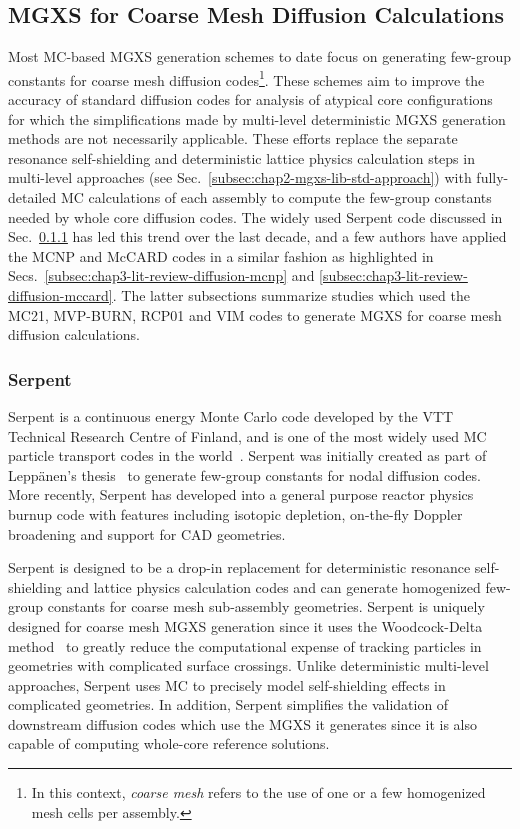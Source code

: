 \subsection{MGXS for Coarse Mesh Diffusion Calculations}
\label{subsec:chap3-lit-review-diffusion}

Most \ac{MC}-based \ac{MGXS} generation schemes to date focus on generating few-group constants for coarse mesh diffusion codes\footnote{In this context, \textit{coarse mesh} refers to the use of one or a few homogenized mesh cells per assembly.}. These schemes aim to improve the accuracy of standard diffusion codes for analysis of atypical core configurations for which the simplifications made by multi-level deterministic \ac{MGXS} generation methods are not necessarily applicable. These efforts replace the separate resonance self-shielding and deterministic lattice physics calculation steps in multi-level approaches (see Sec.~\ref{subsec:chap2-mgxs-lib-std-approach}) with fully-detailed \ac{MC} calculations of each assembly to compute the few-group constants needed by whole core diffusion codes. The widely used Serpent code discussed in Sec.~\ref{subsec:chap3-lit-review-diffusion-serpent} has led this trend over the last decade, and a few authors have applied the MCNP and McCARD codes in a similar fashion as highlighted in Secs.~\ref{subsec:chap3-lit-review-diffusion-mcnp} and \ref{subsec:chap3-lit-review-diffusion-mccard}. The latter subsections summarize studies which used the MC21, MVP-BURN, RCP01 and VIM codes to generate \ac{MGXS} for coarse mesh diffusion calculations.

\subsubsection{Serpent}
\label{subsec:chap3-lit-review-diffusion-serpent}

Serpent is a continuous energy Monte Carlo code developed by the VTT Technical Research Centre of Finland, and is one of the most widely used \ac{MC} particle transport codes in the world~\cite{serpent2013manual}. Serpent was initially created as part of Lepp{\"a}nen's thesis~\cite{leppanen2007serpent} to generate few-group constants for nodal diffusion codes. More recently, Serpent has developed into a general purpose reactor physics burnup code with features including isotopic depletion, on-the-fly Doppler broadening and support for CAD geometries.

Serpent is designed to be a drop-in replacement for deterministic resonance self-shielding and lattice physics calculation codes and can generate homogenized few-group constants for coarse mesh sub-assembly geometries. Serpent is uniquely designed for coarse mesh \ac{MGXS} generation since it uses the Woodcock-Delta method~\cite{woodcock1965techniques} to greatly reduce the computational expense of tracking particles in geometries with complicated surface crossings. Unlike deterministic multi-level approaches, Serpent uses \ac{MC} to precisely model self-shielding effects in complicated geometries. In addition, Serpent simplifies the validation of downstream diffusion codes which use the \ac{MGXS} it generates since it is also capable of computing whole-core reference solutions.


